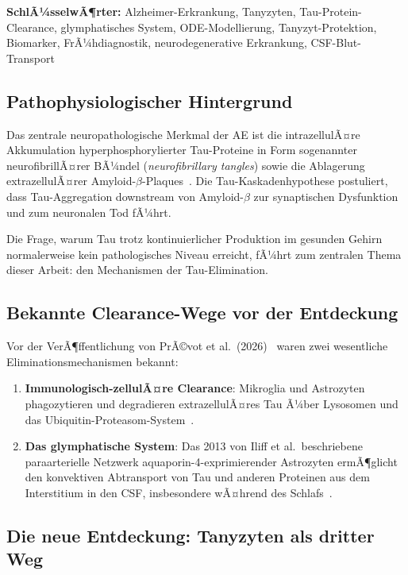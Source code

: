 ﻿\documentclass[12pt,a4paper]{article}
\theoremstyle{definition}
\begin{document}
	\textbf{SchlÃ¼sselwÃ¶rter:} Alzheimer-Erkrankung, Tanyzyten, Tau-Protein-Clearance, glymphatisches System, ODE-Modellierung, Tanyzyt-Protektion, Biomarker, FrÃ¼hdiagnostik, neurodegenerative Erkrankung, CSF-Blut-Transport
	
	\subsection{Pathophysiologischer Hintergrund}
	
	Das zentrale neuropathologische Merkmal der AE ist die intrazellulÃ¤re Akkumulation hyperphosphorylierter Tau-Proteine in Form sogenannter neurofibrillÃ¤rer BÃ¼ndel (\emph{neurofibrillary tangles}) sowie die Ablagerung extrazellulÃ¤rer Amyloid-$\beta$-Plaques~\cite{Braak2006}. Die Tau-Kaskadenhypothese postuliert, dass Tau-Aggregation downstream von Amyloid-$\beta$ zur synaptischen Dysfunktion und zum neuronalen Tod fÃ¼hrt.
	
	Die Frage, warum Tau trotz kontinuierlicher Produktion im gesunden Gehirn normalerweise kein pathologisches Niveau erreicht, fÃ¼hrt zum zentralen Thema dieser Arbeit: den Mechanismen der Tau-Elimination.
	
	\subsection{Bekannte Clearance-Wege vor der Entdeckung}
	
	Vor der VerÃ¶ffentlichung von PrÃ©vot et al.\ (2026)~\cite{Prevot2026} waren zwei wesentliche Eliminationsmechanismen bekannt:
	
	\begin{enumerate}[label=(\roman*)]
		\item \textbf{Immunologisch-zellulÃ¤re Clearance}: Mikroglia und Astrozyten phagozytieren und degradieren extrazellulÃ¤res Tau Ã¼ber Lysosomen und das Ubiquitin-Proteasom-System~\cite{Heneka2015}.
		\item \textbf{Das glymphatische System}: Das 2013 von Iliff et al.\ beschriebene paraarterielle Netzwerk aquaporin-4-exprimierender Astrozyten ermÃ¶glicht den konvektiven Abtransport von Tau und anderen Proteinen aus dem Interstitium in den CSF, insbesondere wÃ¤hrend des Schlafs~\cite{Iliff2013}.
	\end{enumerate}
	
	\subsection{Die neue Entdeckung: Tanyzyten als dritter Weg}
	
\end{document}
